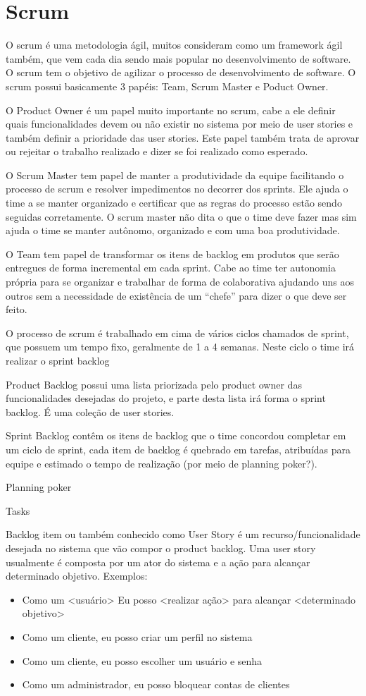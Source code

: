 \documentclass{abnt}
\begin{document}
	\section{Scrum}
		O scrum é uma metodologia ágil, muitos consideram como um framework ágil também, que vem cada dia sendo mais popular
		no desenvolvimento de software.
		O scrum tem o objetivo de agilizar o processo de desenvolvimento de software. O scrum possui basicamente 3
		papéis: Team, Scrum Master e Poduct Owner.
		
		O Product Owner é um papel muito importante no scrum, cabe a ele definir quais funcionalidades devem ou
		não existir no sistema por meio de user stories e também definir a prioridade das user stories. Este papel também
		trata de aprovar ou rejeitar o trabalho realizado e dizer se foi realizado como esperado.
		
		O Scrum Master tem papel de manter a produtividade da equipe facilitando o processo de scrum e resolver impedimentos
		no decorrer dos sprints. Ele ajuda o time a se manter organizado e certificar que as regras do processo estão sendo
		seguidas corretamente. O scrum master não dita o que o time deve fazer mas sim ajuda o time se manter autônomo,
		organizado e com uma boa produtividade. 
		
		O Team tem papel de transformar os itens de backlog em produtos que serão entregues de forma incremental em cada
		sprint. Cabe ao time ter autonomia própria para se organizar e trabalhar de forma de colaborativa ajudando uns aos
		outros sem a necessidade de existência de um ``chefe'' para dizer o que deve ser feito.
		
		O processo de scrum é trabalhado em cima de vários ciclos chamados de sprint, que possuem um tempo fixo, geralmente de
		1 a 4 semanas. Neste ciclo o time irá realizar o sprint backlog
		
		Product Backlog possui uma lista priorizada pelo product owner das funcionalidades desejadas do projeto, e parte
		desta lista irá forma o sprint backlog. É uma coleção de user stories.
		
		Sprint Backlog contêm os itens de backlog que o time concordou completar em um ciclo de sprint, cada item de backlog é
		quebrado em tarefas, atribuídas para equipe e estimado o tempo de realização (por meio de planning poker?).
		
		Planning poker
		
		Tasks
		
		Backlog item ou também conhecido como User Story é um recurso/funcionalidade desejada no sistema que vão compor o
		product backlog. Uma user story usualmente é composta por um ator do sistema e a ação para alcançar determinado
		objetivo. Exemplos: 
			\begin{itemize}
				\item Como um <usuário> Eu posso <realizar ação> para alcançar <determinado objetivo>
				\item Como um cliente, eu posso criar um perfil no sistema
				\item Como um cliente, eu posso escolher um usuário e senha
				\item Como um administrador, eu posso bloquear contas de clientes
			\end{itemize}
				 
\end{document}
